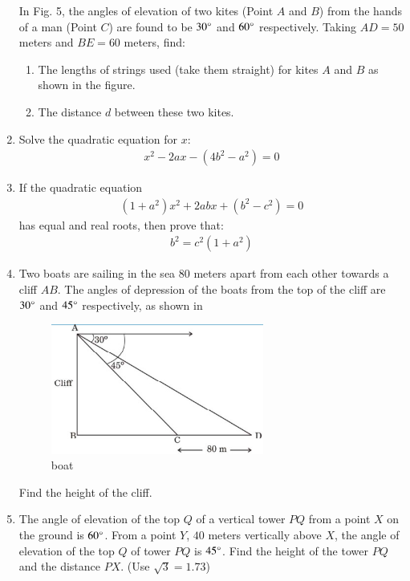 \documentclass{article}
\theoremstyle{remark}
\begin{document}
\begin{enumerate}
    In Fig. 5, the angles of elevation of two kites (Point $A$ and $B$) from the hands of a man (Point $C$) are found to be $30\degree$ and $60\degree$ respectively. Taking $AD = 50$ meters and $BE = 60$ meters, find:
    \begin{enumerate}
        \item The lengths of strings used (take them straight) for kites $A$ and $B$ as shown in the figure.
        \item The distance $d$ between these two kites.
    \end{enumerate}
    
    \item Solve the quadratic equation for $x$:
    \begin{align}
        x^2 - 2ax - (4b^2 - a^2) = 0
    \end{align}
    
    \item If the quadratic equation
    \begin{align}
        (1+a^2)x^2 + 2abx + (b^2-c^2) = 0
    \end{align}
    has equal and real roots, then prove that:
    \begin{align}
        b^2 = c^2(1+a^2)
    \end{align}
    
    \item Two boats are sailing in the sea $80$ meters apart from each other towards a cliff $AB$. The angles of depression of the boats from the top of the cliff are $30\degree$ and $45\degree$ respectively, as shown in 
    
    \begin{figure}[H]
        \centering
        \includegraphics[width=70mm]{figs/boat.edit.jpeg}
        \caption{boat}
        \label{fig:boat.jpeg}
    \end{figure}
    
    Find the height of the cliff.
    
    \item The angle of elevation of the top $Q$ of a vertical tower $PQ$ from a point $X$ on the ground is $60\degree$. From a point $Y$, $40$ meters vertically above $X$, the angle of elevation of the top $Q$ of tower $PQ$ is $45\degree$. Find the height of the tower $PQ$ and the distance $PX$. (Use $\sqrt{3} = 1.73$)
    

\end{enumerate}
\end{document}
